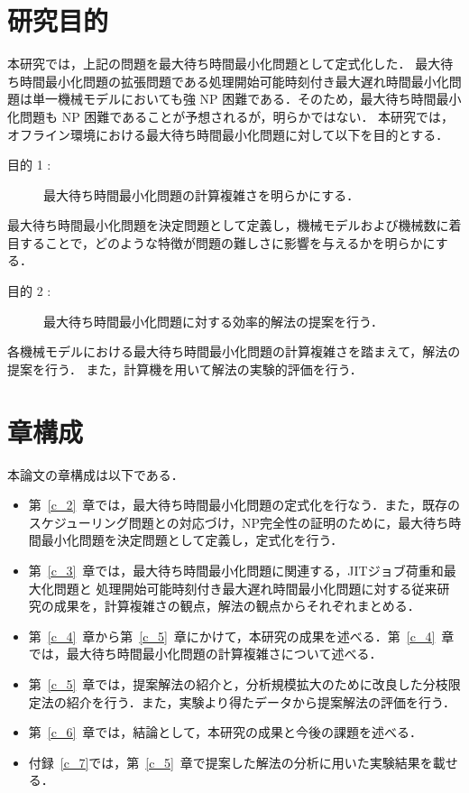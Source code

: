 \documentclass[12pt]{optlab-bachelor}
\begin{document}
\section{研究目的}
本研究では，上記の問題を最大待ち時間最小化問題として定式化した．
最大待ち時間最小化問題の拡張問題である処理開始可能時刻付き最大遅れ時間最小化問題は単一機械モデルにおいても強 NP  困難である．そのため，最大待ち時間最小化問題も NP 困難であることが予想されるが，明らかではない．
本研究では，オフライン環境における最大待ち時間最小化問題に対して以下を目的とする．
\begin{description}
  \item[目的 1 :]
  最大待ち時間最小化問題の計算複雑さを明らかにする．
\end{description}

最大待ち時間最小化問題を決定問題として定義し，機械モデルおよび機械数に着目することで，どのような特徴が問題の難しさに影響を与えるかを明らかにする．

\begin{description}
  \item[目的 2 :]
  最大待ち時間最小化問題に対する効率的解法の提案を行う．
\end{description}

各機械モデルにおける最大待ち時間最小化問題の計算複雑さを踏まえて，解法の提案を行う．
また，計算機を用いて解法の実験的評価を行う．

\section{章構成}
本論文の章構成は以下である．
\begin{itemize}
  \item 第~\ref{c_2}~章では，最大待ち時間最小化問題の定式化を行なう．また，既存のスケジューリング問題との対応づけ，NP完全性の証明のために，最大待ち時間最小化問題を決定問題として定義し，定式化を行う．
  \item 第~\ref{c_3}~章では，最大待ち時間最小化問題に関連する，JITジョブ荷重和最大化問題と
  処理開始可能時刻付き最大遅れ時間最小化問題に対する従来研究の成果を，計算複雑さの観点，解法の観点からそれぞれまとめる．
  \item 第~\ref{c_4}~章から第~\ref{c_5}~章にかけて，本研究の成果を述べる．第~\ref{c_4}~章では，最大待ち時間最小化問題の計算複雑さについて述べる．
  \item 第~\ref{c_5}~章では，提案解法の紹介と，分析規模拡大のために改良した分枝限定法の紹介を行う．また，実験より得たデータから提案解法の評価を行う．
  \item 第~\ref{c_6}~章では，結論として，本研究の成果と今後の課題を述べる．
  \item 付録~\ref{c_7}では，第~\ref{c_5}~章で提案した解法の分析に用いた実験結果を載せる．
\end{itemize}
\end{document}
